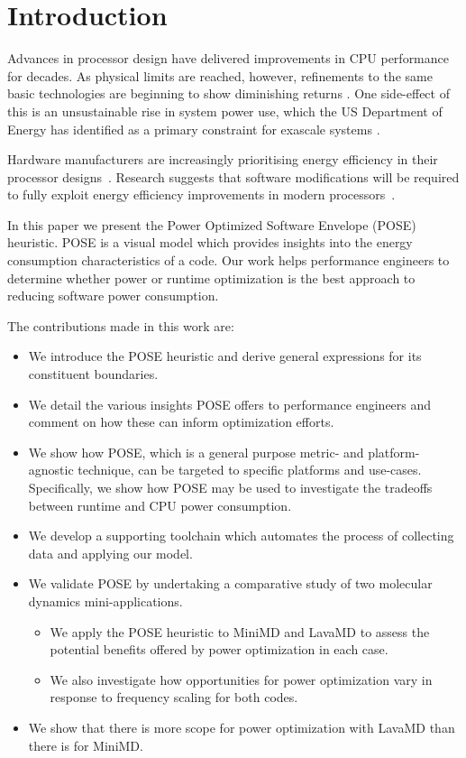 \section{Introduction}
Advances in processor design have delivered improvements in CPU performance for decades. As physical limits are reached, however, refinements to the same basic technologies are beginning to show diminishing returns \cite{esmaeilzadeh:2011aa}. One side-effect of this is an unsustainable rise in system power use, which the US Department of Energy has identified as a primary constraint for exascale systems \cite{shalf:2011aa}.

Hardware manufacturers are increasingly prioritising energy efficiency in their processor designs~\cite{kurd:2014aa}. 
Research suggests that software modifications will be required to fully exploit energy efficiency improvements in modern processors~\cite{shao:2013aa}. 

In this paper we present the Power Optimized Software Envelope (POSE) heuristic.
POSE is a visual model which provides insights into the energy consumption characteristics of a code.
Our work helps performance engineers to determine whether power or runtime optimization is the best approach to reducing software power consumption.

The contributions made in this work are:
\begin{itemize}
  \item We introduce the POSE heuristic and derive general expressions for its constituent boundaries.
  \item We detail the various insights POSE offers to performance engineers and comment on how these can inform optimization efforts.
  \item We show how POSE, which is a general purpose metric- and platform-agnostic technique, can be targeted to specific platforms and use-cases. 
  Specifically, we show how POSE may be used to investigate the tradeoffs between runtime and CPU power consumption.
  \item We develop a supporting toolchain which automates the process of collecting data and applying our model. 
  \item We validate POSE by undertaking a comparative study of two molecular dynamics mini-applications.
    \begin{itemize}
      \item We apply the POSE heuristic to MiniMD and LavaMD to assess the potential benefits offered by power optimization in each case.
      \item We also investigate how opportunities for power optimization vary in response to frequency scaling for both codes.
    \end{itemize}
  \item We show that there is more scope for power optimization with LavaMD than there is for MiniMD.
\end{itemize}

